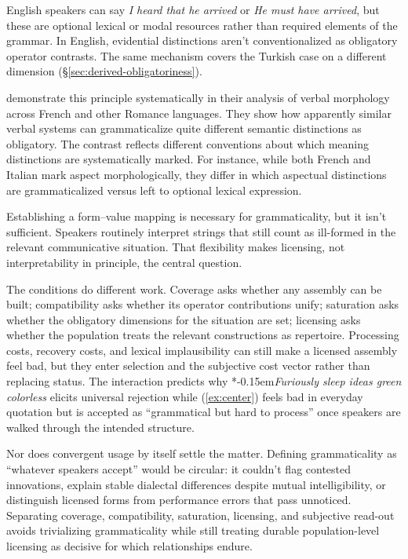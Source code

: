 \documentclass[12pt,letterpaper]{article}
\newcommand{\mention}[1]{\textit{#1}}
\newcommand{\judgesep}{\kern-0.15em}
\newcommand{\ungram}[1]{*\judgesep#1}
\begin{document}
English speakers can say \mention{I heard that he arrived} or \mention{He must have arrived}, but these are optional lexical or modal resources rather than required elements of the grammar. In English, evidential distinctions aren't conventionalized as obligatory operator contrasts. The same mechanism covers the Turkish case on a different dimension (\S\ref{sec:derived-obligatoriness}).

\textcite{kilani2005} demonstrate this principle systematically in their analysis of verbal morphology across French and other Romance languages. They show how apparently similar verbal systems can grammaticalize quite different semantic distinctions as obligatory. The contrast reflects different conventions about which meaning distinctions are systematically marked. For instance, while both French and Italian mark aspect morphologically, they differ in which aspectual distinctions are grammaticalized versus left to optional lexical expression.

Establishing a form--value mapping is necessary for grammaticality, but it isn't sufficient. Speakers routinely interpret strings that still count as ill-formed in the relevant communicative situation. That flexibility makes licensing, not interpretability in principle, the central question.

The conditions do different work. Coverage asks whether any assembly can be built; compatibility asks whether its operator contributions unify; saturation asks whether the obligatory dimensions for the situation are set; licensing asks whether the population treats the relevant constructions as repertoire. Processing costs, recovery costs, and lexical implausibility can still make a licensed assembly feel bad, but they enter selection and the subjective cost vector rather than replacing status. The interaction predicts why \ungram{\mention{Furiously sleep ideas green colorless}} elicits universal rejection while (\ref{ex:center}) feels bad in everyday quotation but is accepted as \enquote{grammatical but hard to process} once speakers are walked through the intended structure.

Nor does convergent usage by itself settle the matter. Defining grammaticality as \enquote{whatever speakers accept} would be circular: it couldn't flag contested innovations, explain stable dialectal differences despite mutual intelligibility, or distinguish licensed forms from performance errors that pass unnoticed. Separating coverage, compatibility, saturation, licensing, and subjective read-out avoids trivializing grammaticality while still treating durable population-level licensing as decisive for which relationships endure.
\end{document}
